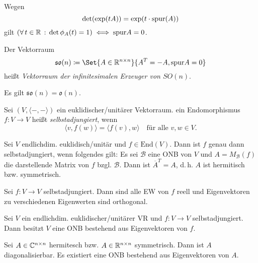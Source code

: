 \documentclass{cheat-sheet}
\newcommand{\End}{\mathrm{End}}
\newcommand{\BB}{\mathcal{B}}
\begin{document}
\begin{bem}
Wegen
\[ \det(\exp(tA)) = \exp(t \cdot \mathrm{spur}(A)) \]
gilt $(\forall \, {t \in \mathbb{R}} \,:\, \det \phi_A(t) = 1) \iff \mathrm{spur} A = 0$.
\end{bem}

\begin{defn}
Der Vektorraum
\[ \mathfrak{so}(n) \coloneqq \Set{ A \in \R^{n \times n} }{ A^T = - A, \spur A = 0 } \]
heißt \emph{Vektorraum der infinitesimalen Erzeuger von $SO(n)$}.
\end{defn}

\begin{satz}
Es gilt $\mathfrak{so}(n) = \mathfrak{o}(n)$.
\end{satz}



\begin{defn}
Sei $(V, \langle - , - \rangle)$ ein euklidischer/unitärer Vektorraum. ein Endomorphismus $f : V \to V$ heißt \emph{selbstadjungiert}, wenn
\[ \langle v, f(w) \rangle = \langle f(v), w \rangle \quad \text{für alle $v, w \in V$.} \]
\end{defn}


\begin{satz}
Sei $V$ endlichdim. euklidisch/unitär und $f \in \End(V)$. Dann ist $f$ genau dann selbstadjungiert, wenn folgendes gilt: Es sei $\BB$ eine ONB von $V$ und $A = M_\BB(f)$ die darstellende Matrix von $f$ bzgl. $\BB$. Dann ist $\overline{A}^T = A$, d.\,h. $A$ ist hermitisch bzw. symmetrisch.
\end{satz}

\begin{satz}
Sei $f : V \to V$ selbstadjungiert. Dann sind alle EW von $f$ reell und Eigenvektoren zu verschiedenen Eigenwerten sind orthogonal.
\end{satz}

\begin{satz}
Sei $V$ ein endlichdim. euklidischer/unitärer VR und $f : V \to V$ selbstadjungiert. Dann besitzt $V$ eine ONB bestehend aus Eigenvektoren von $f$.
\end{satz}

\begin{kor}
Sei $A \in \mathbb{C}^{n \times n}$ hermitesch bzw. $A \in \mathbb{R}^{n \times n}$ symmetrisch. Dann ist $A$ diagonalisierbar. Es existiert eine ONB bestehend aus Eigenvektoren von $A$.
\end{kor}
\end{document}
